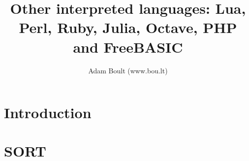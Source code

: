 \documentclass[oneside]{book}
\begin{document}
\author{Adam Boult (www.bou.lt)}
\title{Other interpreted languages: Lua, Perl, Ruby, Julia, Octave, PHP and FreeBASIC}
\maketitle

\setcounter{tocdepth}{0}
\tableofcontents



\part{Introduction}




\part{SORT}

\end{document}
